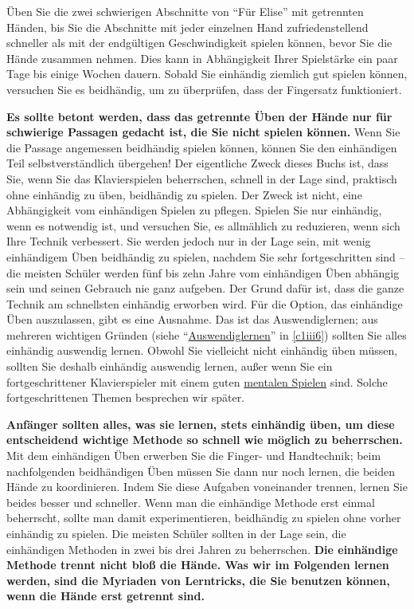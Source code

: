Üben Sie die zwei schwierigen Abschnitte von \enquote{Für Elise} mit getrennten Händen, bis Sie die Abschnitte mit jeder einzelnen Hand zufriedenstellend schneller als mit der endgültigen Geschwindigkeit spielen können, bevor Sie die Hände zusammen nehmen.
Dies kann in Abhängigkeit Ihrer Spielstärke ein paar Tage bis einige Wochen dauern.
Sobald Sie einhändig ziemlich gut spielen können, versuchen Sie es beidhändig, um zu überprüfen, dass der Fingersatz funktioniert.

\textbf{Es sollte betont werden, dass das getrennte Üben der Hände nur für schwierige Passagen gedacht ist, die Sie nicht spielen können.}
Wenn Sie die Passage angemessen beidhändig spielen können, können Sie den einhändigen Teil selbstverständlich übergehen!
Der eigentliche Zweck dieses Buchs ist, dass Sie, wenn Sie das Klavierspielen beherrschen, schnell in der Lage sind, praktisch ohne einhändig zu üben, beidhändig zu spielen.
Der Zweck ist nicht, eine Abhängigkeit vom einhändigen Spielen zu pflegen.
Spielen Sie nur einhändig, wenn es notwendig ist, und versuchen Sie, es allmählich zu reduzieren, wenn sich Ihre Technik verbessert.
Sie werden jedoch nur in der Lage sein, mit wenig einhändigem Üben beidhändig zu spielen, nachdem Sie sehr fortgeschritten sind -- die meisten Schüler werden fünf bis zehn Jahre vom einhändigen Üben abhängig sein und seinen Gebrauch nie ganz aufgeben.
Der Grund dafür ist, dass die ganze Technik am schnellsten einhändig erworben wird.
Für die Option, das einhändige Üben auszulassen, gibt es eine Ausnahme.
Das ist das Auswendiglernen; aus mehreren wichtigen Gründen (siehe \enquote{\hyperref[c1iii6]{Auswendiglernen}} in \autoref{c1iii6}) sollten Sie alles einhändig auswendig lernen.
Obwohl Sie vielleicht nicht einhändig üben müssen, sollten Sie deshalb einhändig auswendig lernen, außer wenn Sie ein fortgeschrittener Klavierspieler mit einem guten \hyperref[c1ii12mental]{mentalen Spielen} sind.
Solche fortgeschrittenen Themen besprechen wir später.

\textbf{Anfänger sollten alles, was sie lernen, stets einhändig üben, um diese entscheidend wichtige Methode so schnell wie möglich zu beherrschen.}
Mit dem einhändigen Üben erwerben Sie die Finger- und Handtechnik; beim nachfolgenden beidhändigen Üben müssen Sie dann nur noch lernen, die beiden Hände zu koordinieren.
Indem Sie diese Aufgaben voneinander trennen, lernen Sie beides besser und schneller.
Wenn man die einhändige Methode erst einmal beherrscht, sollte man damit experimentieren, beidhändig zu spielen ohne vorher einhändig zu spielen.
Die meisten Schüler sollten in der Lage sein, die einhändigen Methoden in zwei bis drei Jahren zu beherrschen.
\textbf{Die einhändige Methode trennt nicht bloß die Hände.
Was wir im Folgenden lernen werden, sind die Myriaden von Lerntricks, die Sie benutzen können, wenn die Hände erst getrennt sind.}

